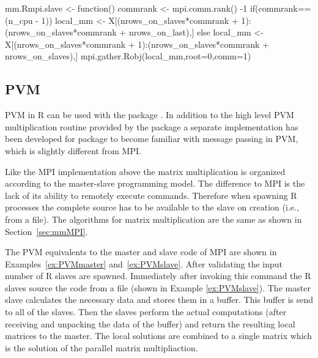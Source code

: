 \begin{Example}
\label{ex:MPIslave}
\begin{Scode}
mm.Rmpi.slave <- function(){
  commrank <- mpi.comm.rank() -1
  if(commrank==(n_cpu - 1))
    local_mm <- X[(nrows_on_slaves*commrank + 1):(nrows_on_slaves*commrank + nrows_on_last),]%
  else
    local_mm <- X[(nrows_on_slaves*commrank + 1):(nrows_on_slaves*commrank + nrows_on_slaves),]%
  mpi.gather.Robj(local_mm,root=0,comm=1)    
}
\end{Scode}
\end{Example}

\subsection{PVM}

PVM in R can be used with the package . In addition to the
high level PVM multiplication routine provided by the package
 a separate implementation has been developed for package
 to become familiar with message passing in PVM, which is
slightly different from MPI. 

Like the MPI implementation above the matrix multiplication is
organized according 
to the master-slave programming model. The difference to MPI is the
lack of its ability to remotely execute commands. Therefore when
spawning R processes the complete source has to be available to the
slave on creation (i.e., from a file). The algorithms for matrix
multiplication are the same as shown in Section~\ref{sec:mmMPI}.

The PVM equivalents to the master and slave code of MPI are shown in
Examples~\ref{ex:PVMmaster} and~\ref{ex:PVMslave}.
After validating the input  number of R slaves are
spawned. Immediately after invoking this command the R slaves source
the code from a file  (shown in Example
\ref{ex:PVMslave}). The master slave
calculates the necessary data and stores them in a buffer. This buffer
is send to all of the slaves. Then
the slaves perform the actual computations (after receiving and
unpacking the data of the buffer) and return the resulting
local matrices to the master. The local solutions are combined to a
single matrix which is the solution of the parallel matrix
multipliaction.


